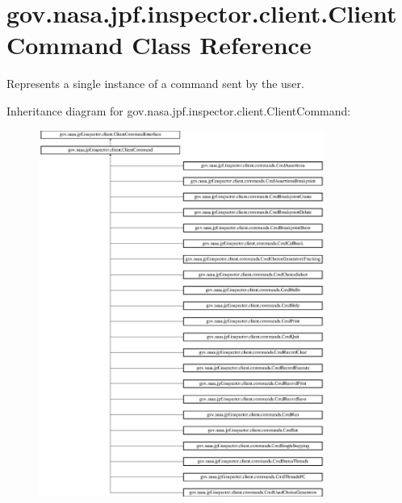 \hypertarget{classgov_1_1nasa_1_1jpf_1_1inspector_1_1client_1_1_client_command}{}\section{gov.\+nasa.\+jpf.\+inspector.\+client.\+Client\+Command Class Reference}
\label{classgov_1_1nasa_1_1jpf_1_1inspector_1_1client_1_1_client_command}


Represents a single instance of a command sent by the user.  


Inheritance diagram for gov.\+nasa.\+jpf.\+inspector.\+client.\+Client\+Command\+:\begin{figure}[H]
\begin{center}
\leavevmode
\includegraphics[height=12.000000cm]{classgov_1_1nasa_1_1jpf_1_1inspector_1_1client_1_1_client_command}
\end{center}
\end{figure}
